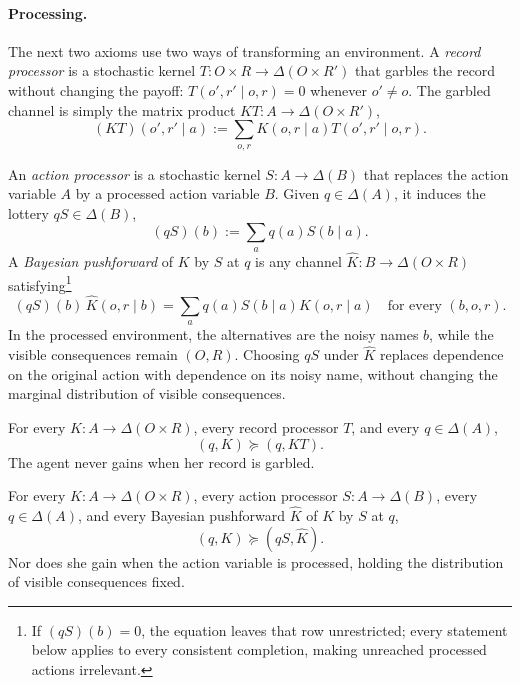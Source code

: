 \documentclass[11pt,a4paper]{article}
\theoremstyle{definition}
\newcommand{\D}{\Delta}
\newcommand{\1}{\mathbf 1}
\begin{document}
\paragraph{Processing.}
The next two axioms use two ways of transforming an environment.  A \emph{record processor} is a stochastic
kernel $T:O\times R\to\D(O\times R')$ that garbles the record without changing the payoff:
$T(o',r'\mid o,r)=0$ whenever $o'\neq o$.  The garbled channel is simply the matrix product
$KT:A\to\D(O\times R')$,
\[
 (KT)(o',r'\mid a)
 :=\sum_{o,r}K(o,r\mid a)T(o',r'\mid o,r).
\]

An \emph{action processor} is a stochastic kernel $S:A\to\D(B)$ that replaces the action variable $A$ by a
processed action variable $B$.  Given $q\in\D(A)$, it induces the lottery $qS\in\D(B)$,
\[
 (qS)(b):=\sum_aq(a)S(b\mid a).
\]
A \emph{Bayesian pushforward} of $K$ by $S$ at $q$ is any channel $\widehat K:B\to\D(O\times R)$
satisfying\footnote{If $(qS)(b)=0$, the
equation leaves that row unrestricted; every statement below applies to every consistent completion, making
unreached processed actions irrelevant.}
\begin{equation}
 (qS)(b)\,\widehat K(o,r\mid b)
 =\sum_a q(a)S(b\mid a)K(o,r\mid a)
 \quad\text{for every }(b,o,r).
 \label{eq:action-processing}
\end{equation}
In the processed environment, the alternatives are the noisy names $b$, while the visible consequences remain
$(O,R)$.  Choosing $qS$ under $\widehat K$ replaces dependence on the original action with dependence on its
noisy name, without changing the marginal distribution of visible consequences.

\begin{description}[leftmargin=*,style=sameline]

\item[(A6) Record data processing.]
For every $K:A\to\D(O\times R)$, every record processor $T$, and every $q\in\D(A)$,
\[
 (q,K)\succeq(q,KT).
\]
The agent never gains when her record is garbled.

\item[(A7) Action data processing.]
For every $K:A\to\D(O\times R)$, every action processor $S:A\to\D(B)$, every $q\in\D(A)$, and every Bayesian
pushforward $\widehat K$ of $K$ by $S$ at $q$,
\[
 (q,K)\succeq(qS,\widehat K).
\]
Nor does she gain when the action variable is processed, holding the distribution of visible consequences fixed.

\end{description}
\end{document}
